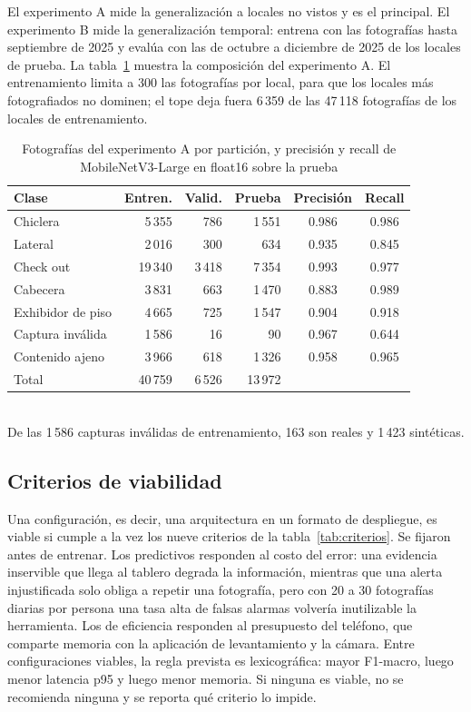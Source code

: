 \documentclass[conference]{IEEEtran}
\begin{document}
El experimento A mide la generalización a locales no vistos y es el principal. El experimento B mide la
generalización temporal: entrena con las fotografías hasta septiembre de 2025 y evalúa con las de octubre a
diciembre de 2025 de los locales de prueba. La tabla~\ref{tab:datos} muestra la composición del experimento A. El
entrenamiento limita a 300 las fotografías por local, para que los locales más fotografiados no dominen; el tope
deja fuera 6\,359 de las 47\,118 fotografías de los locales de entrenamiento.

\begin{table}[t]
\caption{Fotografías del experimento A por partición, y precisión y recall de MobileNetV3-Large en float16 sobre la
prueba}
\label{tab:datos}
\centering
\setlength{\tabcolsep}{3.5pt}
\begin{tabular}{@{}lrrrcc@{}}
\toprule
Clase & Entren. & Valid. & Prueba & Precisión & Recall \\
\midrule
Chiclera & 5\,355 & 786 & 1\,551 & 0.986 & 0.986 \\
Lateral & 2\,016 & 300 & 634 & 0.935 & 0.845 \\
Check out & 19\,340 & 3\,418 & 7\,354 & 0.993 & 0.977 \\
Cabecera & 3\,831 & 663 & 1\,470 & 0.883 & 0.989 \\
Exhibidor de piso & 4\,665 & 725 & 1\,547 & 0.904 & 0.918 \\
Captura inválida & 1\,586 & 16 & 90 & 0.967 & 0.644 \\
Contenido ajeno & 3\,966 & 618 & 1\,326 & 0.958 & 0.965 \\
\midrule
Total & 40\,759 & 6\,526 & 13\,972 & & \\
\bottomrule
\end{tabular}
\\[2pt]
\footnotesize De las 1\,586 capturas inválidas de entrenamiento, 163 son reales y 1\,423 sintéticas.
\end{table}

\subsection{Criterios de viabilidad}

Una configuración, es decir, una arquitectura en un formato de despliegue, es viable si cumple a la vez los nueve
criterios de la tabla~\ref{tab:criterios}. Se fijaron antes de entrenar. Los predictivos responden al costo del
error: una evidencia inservible que llega al tablero degrada la información, mientras que una alerta injustificada
solo obliga a repetir una fotografía, pero con 20 a 30 fotografías diarias por persona una tasa alta de falsas
alarmas volvería inutilizable la herramienta. Los de eficiencia responden al presupuesto del teléfono, que
comparte memoria con la aplicación de levantamiento y la cámara. Entre configuraciones viables, la regla prevista
es lexicográfica: mayor F1-macro, luego menor latencia p95 y luego menor memoria. Si ninguna es viable, no se
recomienda ninguna y se reporta qué criterio lo impide.
\end{document}
